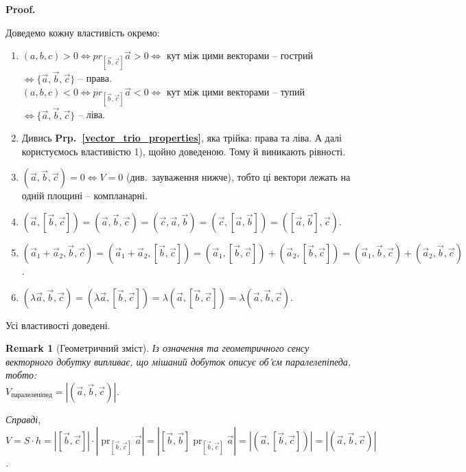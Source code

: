 \documentclass[a4paper, 10pt]{extarticle}
\makeatletter
\def\qed{$\blacksquare$}
\newcommand\prpref[1]{\textbf{Prp.~\ref{#1}}}
\def\qed{$\blacksquare$}
\theoremstyle{theoremdd}
\theoremstyle{theoremdd}
\theoremstyle{theoremdd}
\theoremstyle{theoremdd}
\theoremstyle{theoremdd}
\theoremstyle{theoremdd}
\newtheorem{remark}[theorem]{Remark}
\theoremstyle{theoremdd}
\theoremstyle{theoremdd}
\renewenvironment{proof}[1][Proof.\\]{\par
\pushQED{\hfill \qed}%
\normalfont \topsep6\p@\@plus6\p@\relax
\trivlist
\item\relax
{\bfseries
#1\@addpunct{.}}\hspace\labelsep\ignorespaces
}{%
\popQED\endtrivlist\@endpefalse
}
\DeclareMathOperator{\pr}{pr}
\makeatother
\begin{document}
\begin{proof}
Доведемо кожну властивість окремо:
\begin{enumerate}[wide=0pt,label={\arabic*)}]
\item $(a,b,c) > 0 \iff pr_{[\vec{b}, \vec{c}]} \vec{a} > 0 \iff$ кут між цими векторами -- гострий $\iff \{\vec{a}, \vec{b}, \vec{c}\}$ -- права.\\
$(a,b,c) < 0 \iff pr_{[\vec{b}, \vec{c}]} \vec{a} < 0 \iff$ кут між цими векторами -- тупий $\iff \{\vec{a}, \vec{b}, \vec{c}\}$ -- ліва.

\item Дивись \prpref{vector_trio_properties}, яка трійка: права та ліва. А далі користуємось властивістю 1), щойно доведеною. Тому й виникають рівності.

\item $(\vec{a}, \vec{b}, \vec{c}) = 0 \iff V = 0$ (див.\ зауваження нижче), тобто ці вектори лежать на одній площині -- компланарні.

\item $(\vec{a}, [\vec{b},\vec{c}]) = (\vec{a}, \vec{b}, \vec{c}) = (\vec{c}, \vec{a}, \vec{b}) = (\vec{c}, [\vec{a}, \vec{b}]) = ([\vec{a},\vec{b}], \vec{c})$.

\item $(\vec{a}_1+\vec{a}_2, \vec{b}, \vec{c}) = (\vec{a}_1+\vec{a}_2, [\vec{b},\vec{c}]) = (\vec{a}_1,[\vec{b},\vec{c}]) + (\vec{a}_2,[\vec{b},\vec{c}]) = (\vec{a}_1,\vec{b},\vec{c}) + (\vec{a}_2,\vec{b},\vec{c})$.

\item $(\lambda \vec{a}, \vec{b}, \vec{c}) = (\lambda \vec{a}, [\vec{b}, \vec{c}]) = \lambda (\vec{a},[\vec{b},\vec{c}]) = \lambda (\vec{a},\vec{b},\vec{c})$.
\end{enumerate}
Усі властивості доведені.
\end{proof}

\begin{remark}[Геометричний зміст]
Із означення та геометричного сенсу векторного добутку випливає, що мішаний добуток описує об'єм паралелепіпеда, тобто:\\
$V_{\text{паралелепіпед}} = |(\vec{a},\vec{b},\vec{c})|$.
\begin{figure}[H]
\centering
{}
\end{figure}
Справді, $V = S\cdot h = |[\vec{b}, \vec{c}]| \cdot |\pr_{[\vec{b}, \vec{c}]} \vec{a}| = |[\vec{b}, \vec{b}] \pr_{[\vec{b}, \vec{c}]} \vec{a}| = |(\vec{a}, [\vec{b}, \vec{c}])| = |(\vec{a},\vec{b},\vec{c})|$.
\end{remark}
\end{document}
